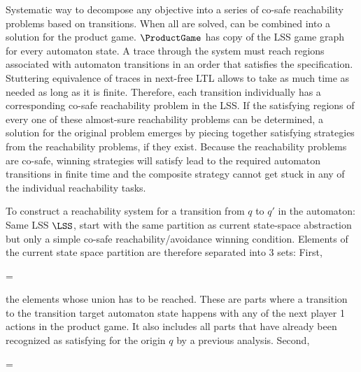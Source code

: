 \stopsubsection


\startsubsection[title={Transition-based Reachability Decomposition},reference=sec:refinement-transition-decomposition]

    Systematic way to decompose any objective into a series of co-safe reachability problems based on transitions.
    When all are solved, can be combined into a solution for the product game.
    $\ProductGame$ has copy of the LSS game graph for every automaton state.
    A trace through the system must reach regions associated with automaton transitions in an order that satisfies the specification.
    Stuttering equivalence of traces in next-free LTL allows to take as much time as needed as long as it is finite.
    Therefore, each transition individually has a corresponding co-safe reachability problem in the LSS.
    If the satisfying regions of every one of these almost-sure reachability problems can be determined, a solution for the original problem emerges by piecing together satisfying strategies from the reachability problems, if they exist.
    Because the reachability problems are co-safe, winning strategies will satisfy lead to the required automaton transitions in finite time and the composite strategy cannot get stuck in any of the individual reachability tasks.

    To construct a reachability system for a transition from $q$ to $q'$ in the automaton:
    Same LSS $\LSS$, start with the same partition as current state-space abstraction but only a simple co-safe reachability/avoidance winning condition.
    Elements of the current state space partition are therefore separated into 3 sets:
    First,

    \startformula
         =  \EndComma
    \stopformula

    the elements whose union has to be reached.
    These are parts where a transition to the transition target automaton state happens with any of the next player 1 actions in the product game.
    It also includes all parts that have already been recognized as satisfying for the origin $q$ by a previous analysis.
    Second,

    \startformula
         =  \EndComma
    \stopformula

